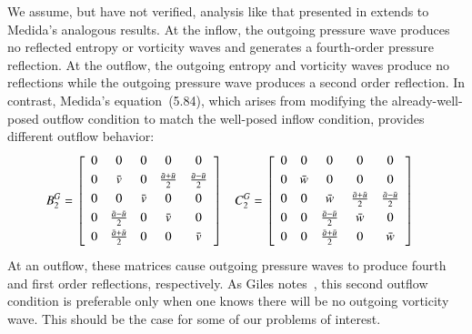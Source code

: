 \documentclass[letterpaper,11pt,nointlimits,reqno,draft]{amsbook}
\begin{document}
We assume, but have not verified, analysis like that presented in
\citet[\textsection{}3.7.4]{Giles1988Nonreflecting} extends to Medida's
analogous results.  At the inflow, the outgoing pressure wave produces no
reflected entropy or vorticity waves and generates a fourth-order pressure
reflection.  At the outflow, the outgoing entropy and vorticity waves produce
no reflections while the outgoing pressure wave produces a second order
reflection.  In contrast, Medida's equation~(5.84), which arises from modifying
the already-well-posed outflow condition to match the well-posed inflow
condition, provides different outflow behavior:
\begin{align}
\label{eq:dimeulerapproxmedidaopt2}
  B^G_2 &= \left[\begin{array}{ccccc}
    0 & 0                         & 0       & 0                           & 0                         \\ \noalign{\smallskip}
    0 & \bar{v}                   & 0       & \frac{\bar{a} + \bar{u}}{2} & \frac{\bar{a}-\bar{u}}{2} \\ \noalign{\smallskip}
    0 & 0                         & \bar{v} & 0                           & 0                         \\ \noalign{\smallskip}
    0 & \frac{\bar{a}-\bar{u}}{2} & 0       & \bar{v}                     & 0                         \\ \noalign{\smallskip}
    0 & \frac{\bar{a}+\bar{u}}{2} & 0       & 0                           & \bar{v}                   \\ \noalign{\smallskip}
  \end{array}\right]
&
  C^G_2 &= \left[\begin{array}{ccccc}
    0 & 0       & 0                         & 0                         & 0                         \\ \noalign{\smallskip}
    0 & \bar{w} & 0                         & 0                         & 0                         \\ \noalign{\smallskip}
    0 & 0       & \bar{w}                   & \frac{\bar{a}+\bar{u}}{2} & \frac{\bar{a}-\bar{u}}{2} \\ \noalign{\smallskip}
    0 & 0       & \frac{\bar{a}-\bar{u}}{2} & \bar{w}                   & 0                         \\ \noalign{\smallskip}
    0 & 0       & \frac{\bar{a}+\bar{u}}{2} & 0                         & \bar{w}                   \\ \noalign{\smallskip}
  \end{array}\right]
\end{align}
At an outflow, these matrices cause outgoing pressure waves to produce fourth
and first order reflections, respectively.  As Giles
notes~\citep{Giles1990Nonreflecting}, this second outflow condition is
preferable only when one knows there will be no outgoing vorticity wave.  This
should be the case for some of our problems of interest.
\end{document}
